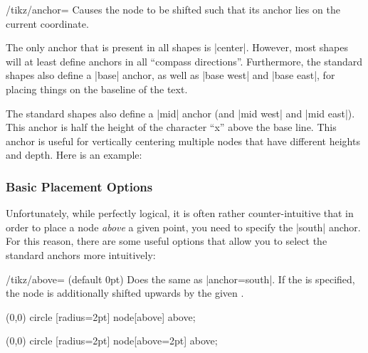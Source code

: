 \begin{key}{/tikz/anchor=}
    Causes the node to be shifted such that its anchor  lies
    on the current coordinate.

    The only anchor that is present in all shapes is |center|. However, most
    shapes will at least define anchors in all ``compass directions''.
    Furthermore, the standard shapes also define a |base| anchor, as well as
    |base west| and |base east|, for placing things on the baseline of the
    text.

    The standard shapes also define a |mid| anchor (and |mid west| and
    |mid east|). This anchor is half the height of the character ``x'' above
    the base line. This anchor is useful for vertically centering multiple
    nodes that have different heights and depth. Here is an example:
\begin{codeexample}[]
\end{codeexample}
\end{key}


\subsubsection{Basic Placement Options}

Unfortunately, while perfectly logical, it is often rather counter-intuitive
that in order to place a node \emph{above} a given point, you need to specify
the |south| anchor. For this reason, there are some useful options that allow
you to select the standard anchors more intuitively:

\begin{key}{/tikz/above= (default 0pt)}
    Does the same as |anchor=south|. If the  is specified, the
    node is additionally shifted upwards by the given .
\begin{codeexample}[]
\tikz \fill (0,0) circle [radius=2pt] node[above] {above};
\end{codeexample}
\begin{codeexample}[]
\tikz \fill (0,0) circle [radius=2pt] node[above=2pt] {above};
\end{codeexample}
\end{key}

